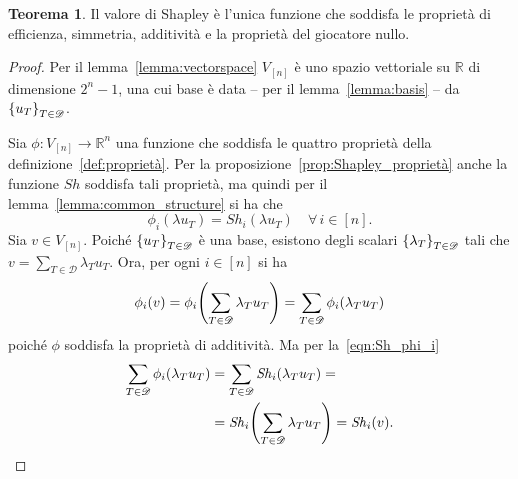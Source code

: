 \documentclass[a4paper,11pt]{article}
\theoremstyle{definition}				%
\newtheorem{teorema}{Teorema}
\theoremstyle{remark}
\theoremstyle{plain}
\newcommand{\R}{\mathbb{R}}										%
\begin{document}

	
	\begin{teorema}\label{teor:Shapley}
		Il valore di Shapley è l'unica funzione che soddisfa le proprietà di efficienza, simmetria, additività e la proprietà del giocatore nullo. 
	\end{teorema}
	\begin{proof}
        Per il lemma~\ref{lemma:vectorspace} $V_{[n]}$ è uno spazio vettoriale su $\R$ di dimensione $2^n-1$, una cui base è data -- per il lemma~\ref{lemma:basis} -- da $\qty{u_T}_{T\in\mathscr{D}}$.

        Sia $\phi\colon V_{[n]}\to\R^n$ una funzione che soddisfa le quattro proprietà della definizione~\ref{def:proprietà}. Per la proposizione~\ref{prop:Shapley_proprietà} anche la funzione $\mathit{Sh}$ soddisfa tali proprietà, ma quindi per il lemma~\ref{lemma:common_structure} si ha che
        \begin{equation}\label{eqn:Sh_phi_i}
            \phi_i(\lambda u_T)=\mathit{Sh}_i(\lambda u_T)\quad\forall\,i\in[n].
        \end{equation}
        Sia $v\in V_{[n]}$. Poiché $\qty{u_T}_{T\in\mathscr{D}}$ è una base, esistono degli scalari $\qty{\lambda_T}_{T\in\mathscr{D}}$ tali che $v=\sum_{T\in\mathscr{D}}\lambda_T u_T$. Ora, per ogni $i\in[n]$ si ha
        \[
            \phi_i(v) = \phi_i\qty(\sum_{T\in\mathscr{D}}\lambda_Tu_T) = \sum_{T\in\mathscr{D}}\phi_i(\lambda_Tu_T)        
        \]
        poiché $\phi$ soddisfa la proprietà di additività. Ma per la~\eqref{eqn:Sh_phi_i}
        \begin{align*}
            \sum_{T\in\mathscr{D}}\phi_i(\lambda_Tu_T)&=\sum_{T\in\mathscr{D}}\mathit{Sh}_i(\lambda_Tu_T)=\\
             &=\mathit{Sh}_i\qty(\sum_{T\in\mathscr{D}}\lambda_Tu_T)=\mathit{Sh}_i(v).\qedhere
        \end{align*}
	\end{proof}
\end{document}
